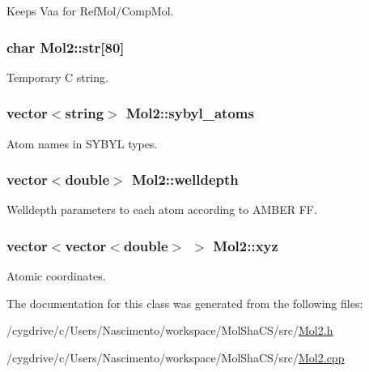 Keeps Vaa for RefMol/CompMol. 

\hypertarget{classMol2_a6041f89cb497b7bd329a7d2de0bdd164}{
\subsubsection[{str}]{\setlength{\rightskip}{0pt plus 5cm}char {\bf Mol2::str}\mbox{[}80\mbox{]}}}
\label{classMol2_a6041f89cb497b7bd329a7d2de0bdd164}


Temporary C string. 

\hypertarget{classMol2_a5a55037dab7bfc93bbc79be4370d4cb0}{
\subsubsection[{sybyl\_\-atoms}]{\setlength{\rightskip}{0pt plus 5cm}vector$<$string$>$ {\bf Mol2::sybyl\_\-atoms}}}
\label{classMol2_a5a55037dab7bfc93bbc79be4370d4cb0}


Atom names in SYBYL types. 

\hypertarget{classMol2_aa6b07421f7462dbbb56fdae22b01dcd3}{
\subsubsection[{welldepth}]{\setlength{\rightskip}{0pt plus 5cm}vector$<$double$>$ {\bf Mol2::welldepth}}}
\label{classMol2_aa6b07421f7462dbbb56fdae22b01dcd3}


Welldepth parameters to each atom according to AMBER FF. 

\hypertarget{classMol2_afb3479b3d5aea0293e981c2f94f20851}{
\subsubsection[{xyz}]{\setlength{\rightskip}{0pt plus 5cm}vector$<$vector$<$double$>$ $>$ {\bf Mol2::xyz}}}
\label{classMol2_afb3479b3d5aea0293e981c2f94f20851}


Atomic coordinates. 



The documentation for this class was generated from the following files:\begin{DoxyCompactItemize}
\item 
/cygdrive/c/Users/Nascimento/workspace/MolShaCS/src/\hyperlink{Mol2_8h}{Mol2.h}\item 
/cygdrive/c/Users/Nascimento/workspace/MolShaCS/src/\hyperlink{Mol2_8cpp}{Mol2.cpp}\end{DoxyCompactItemize}
